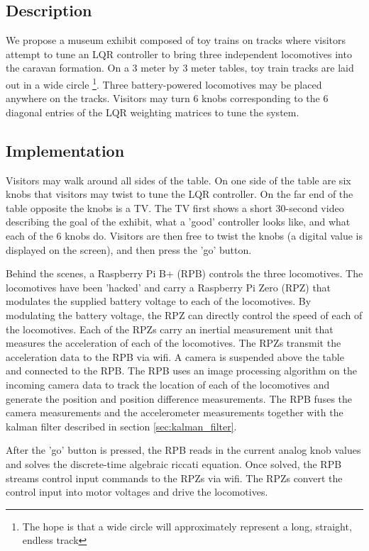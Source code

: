 \documentclass[12pt,onecolumn,reqno]{amsart}
\begin{document}
\subsection{Description}
We propose a museum exhibit composed of toy trains on tracks where visitors
attempt to tune an LQR controller to bring three independent locomotives into
the caravan formation. On a 3 meter by 3 meter tables, toy train tracks are laid
out in a wide circle \footnote {The hope is that a wide circle will
approximately represent a long, straight, endless track}. Three battery-powered
locomotives may be placed anywhere on the tracks. Visitors may turn 6 knobs
corresponding to the 6 diagonal entries of the LQR weighting matrices to tune
the system.


\subsection{Implementation}
Visitors may walk around all sides of the table. On one side of the table are
six knobs that visitors may twist to tune the LQR controller. On the far end of
the table opposite the knobs is a TV. The TV first shows a short 30-second video
describing the goal of the exhibit, what a 'good' controller looks like, and
what each of the 6 knobs do. Visitors are then free to twist the knobs (a
digital value is displayed on the screen), and then press the 'go' button.

Behind the scenes, a Raspberry Pi B+ (RPB) controls the three locomotives. The
locomotives have been 'hacked' and carry a Raspberry Pi Zero (RPZ) that
modulates the supplied battery voltage to each of the locomotives. By modulating
the battery voltage, the RPZ can directly control the speed of each of the
locomotives. Each of the RPZs carry an inertial measurement unit that measures
the acceleration of each of the locomotives. The RPZs transmit the acceleration
data to the RPB via wifi. A camera is suspended above the table and connected to
the RPB. The RPB uses an image processing algorithm on the incoming camera data
to track the location of each of the locomotives and generate the position and
position difference measurements. The RPB fuses the camera measurements and the
accelerometer measurements together with the kalman filter described in section
\ref{sec:kalman_filter}.

After the 'go' button is pressed, the RPB reads in the current analog knob
values and solves the discrete-time algebraic riccati equation. Once solved, the
RPB streams control input commands to the RPZs via wifi. The RPZs convert the
control input into motor voltages and drive the locomotives. 
\end{document}
